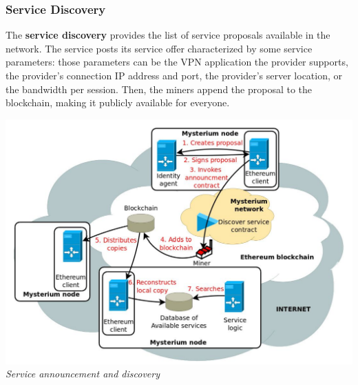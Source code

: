 \documentclass[12pt]{article}
\begin{document}
	\subsubsection{Service Discovery}
	The \textbf{service discovery} provides the list of service proposals available in the network. The service posts its service offer characterized by some service parameters: those parameters can be the VPN application the provider supports, the provider's connection IP address and port, the provider's server location, or the bandwidth per session. Then, the miners append the proposal to the blockchain, making it publicly available for everyone.\\

	\bigbreak
	\begin{center}
		\includegraphics[width=1\linewidth]{images/mysterium_service_announcement.png}\\
		\small{\textit{Service announcement and discovery}}
	\end{center}
	
\end{document}
